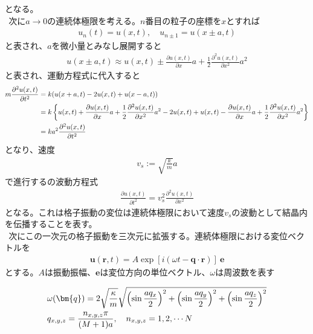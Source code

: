 \documentclass[dvipdfmx, 11pt, a4paper]{jsarticle}
\numberwithin{equation}{section}
\theoremstyle{definition}
\begin{document}
    となる。\\
    $\ \ $次に$a \rightarrow 0$の連続体極限を考える。$n$番目の粒子の座標を$x$とすれば
    \begin{align}
        u_n(t) = u(x,t),\quad u_{n\pm1} = u(x\pm a,t)
    \end{align}
    と表され、$a$を微小量とみなし展開すると
    \begin{align}
        u(x\pm a,t) \approx u(x,t) \pm \frac{\partial u(x,t)}{\partial x} a +\frac{1}{2} \frac{\partial^2 u(x,t)}{\partial x^2}a^2
    \end{align}
    と表され、運動方程式に代入すると
    \begin{align}
        m\frac{\partial^2 u(x,t)}{\partial t^2} &= k(u(x+a,t) -2u(x,t)+u(x-a,t)) \notag \\
        &= k\left\{ u(x,t) + \frac{\partial u(x,t)}{\partial x} a +\frac{1}{2} \frac{\partial^2 u(x,t)}{\partial x^2}a^2 -2u(x,t) + u(x,t) - \frac{\partial u(x,t)}{\partial x} a +\frac{1}{2} \frac{\partial^2 u(x,t)}{\partial x^2}a^2\right\} \notag \\
        &= ka^2 \frac{\partial^2 u(x,t) }{\partial t^2}
    \end{align}
    となり、速度
    \begin{align}
        v_s := \sqrt{\frac{k}{m}}a
    \end{align}
    で進行するの波動方程式
    \begin{align}
        \frac{\partial u(x,t)}{\partial t^2} = v_s^2 \frac{\partial^2 u(x,t) }{\partial x^2}
    \end{align}
    となる。これは格子振動の変位は連続体極限において速度$v_s$の波動として結晶内を伝播することを表す。\\
    $\ \ $次にこの一次元の格子振動を三次元に拡張する。連続体極限における変位ベクトルを
    \begin{align}
        \bm{u}(\bm{r},t) = A\exp[i(\omega t - \bm{q}\cdot \bm{r})]\ \bm{e}
    \end{align}
    とする。$A$は振動振幅、$\bm{e}$は変位方向の単位ベクトル、$\omega$は周波数を表す
    \begin{note}[?]
        \begin{align}
            &\omega (\bm{q}) = 2 \sqrt{\frac{\kappa}{m}} \sqrt{\left( \sin \frac{aq_x}{2} \right)^2 + \left( \sin \frac{aq_y}{2} \right)^2 + \left( \sin \frac{aq_z}{2} \right)^2} \\
            &q_{x,y,z} = \frac{n_{x,y,z}\pi}{(M+1)a},\quad n_{x,y,z} = 1,2,\cdots N \notag 
        \end{align} 
    \end{note}
\end{document}
